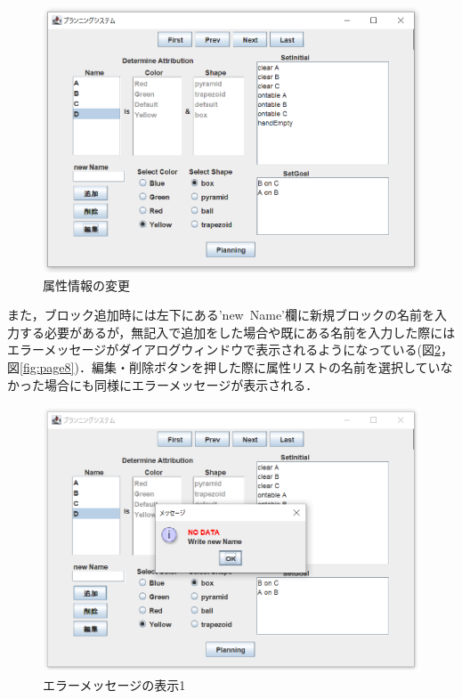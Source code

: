 \documentclass[12pt]{jarticle}
\begin{document}
\begin{figure}[htbp]
  \begin{center}
    \includegraphics[scale=0.6]{images/page6.PNG}
    \caption{属性情報の変更}
    \label{fig:page6}
  \end{center}
\end{figure}
また，ブロック追加時には左下にある'new\ Name'欄に新規ブロックの名前を入力する必要があるが，無記入で追加をした場合や既にある名前を入力した際にはエラーメッセージがダイアログウィンドウで表示されるようになっている(図\ref{fig:page7}，図\ref{fig:page8})．編集・削除ボタンを押した際に属性リストの名前を選択していなかった場合にも同様にエラーメッセージが表示される．\\
\begin{figure}[htbp]
  \begin{center}
    \includegraphics[scale=0.6]{images/page7.PNG}
    \caption{エラーメッセージの表示1}
    \label{fig:page7}
  \end{center}
\end{figure}
\end{document}
